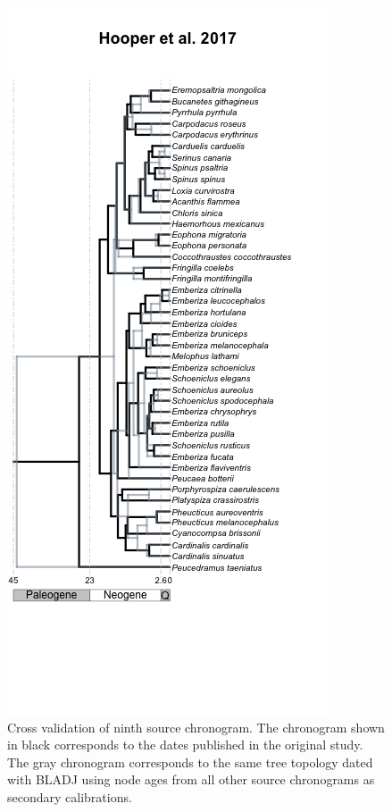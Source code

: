 \documentclass[
  english,
  man]{apa6}
\begin{document}
\begin{figure}[!h]
\includegraphics{../figures/figure-cross-validation/cross_validation_9.png}
\caption{Cross validation of ninth source chronogram. The chronogram shown in black corresponds to the dates published in the original study. The gray chronogram corresponds to the same tree topology dated with BLADJ using node ages from all other source chronograms as secondary calibrations.}
\label{fig:cv9}
\end{figure}
\end{document}
